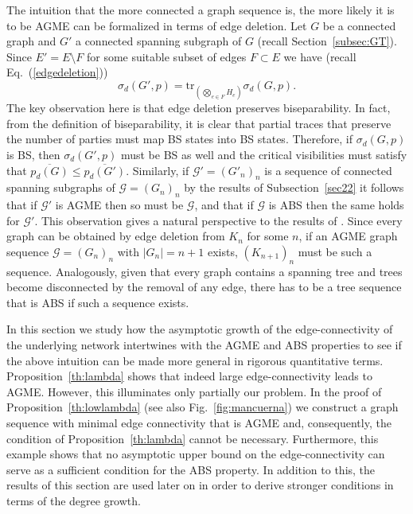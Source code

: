 \documentclass[a4paper,onecolumn,accepted=2024-12-14]{quantumarticle}
\theoremstyle{plain}
\def\tr{\mathrm{tr}}
\newcommand{\cG}{{\mathcal G}}         %
\begin{document}
The intuition that the more connected a graph sequence is, the more likely it is to be AGME can be formalized in terms of edge deletion. Let $G$ be a connected graph and $G'$ a connected spanning subgraph of $G$ (recall Section~\ref{subsec:GT}).
Since $E'=E\setminus F$ for some suitable subset of edges $F\subset E$ we have (recall Eq.~(\ref{edgedeletion}))
\begin{equation}
\sigma_d(G',p)=\tr_{\left(\bigotimes_{e\in F}H_e\right)}\sigma_d(G,p).
\end{equation}
The key observation here is that edge deletion preserves biseparability. In fact, from
the definition of biseparability, it is clear that partial traces that preserve the number of parties must map BS states into BS states. Therefore, if $\sigma_d(G,p)$ is BS, then $\sigma_d(G',p)$ must be BS as well and the critical visibilities must satisfy that $\overline{p_d(G)}\leq\overline{p_d(G')}$. Similarly, if $\cG'=(G'_n)_n$ is a sequence of connected spanning subgraphs of $\cG=(G_n)_n$ by the results of Subsection~\ref{sec22} it follows that if $\cG'$ is AGME then so must be $\cG$, and that if $\cG$ is ABS then the same holds for $\cG'$. This observation gives a natural perspective to the results of \cite{ASGME}.
Since every graph can be obtained by edge deletion from $K_n$ for some $n$, if an AGME graph sequence $\cG=(G_n)_n$ with $|G_n|=n+1$ exists, $(K_{n+1})_n$ must be such a sequence. Analogously, given that every graph contains a spanning tree and trees become disconnected by the removal of any edge, there has to be a tree sequence that is ABS if such a sequence exists.

In this section we study how the asymptotic growth of the edge-connectivity
of the underlying network intertwines with the AGME and ABS properties to see if the above intuition can be made more general in rigorous quantitative terms. Proposition~\ref{th:lambda} shows that indeed large edge-connectivity leads to AGME. However, this illuminates only partially our problem.
In the proof of Proposition~\ref{th:lowlambda} (see also Fig.~\ref{fig:mancuerna})
we construct a graph sequence with minimal edge connectivity that is AGME and, consequently, the condition of Proposition~\ref{th:lambda} cannot be necessary. Furthermore, this example shows that no asymptotic upper bound on the edge-connectivity can serve as a sufficient condition for the ABS property. In addition to this, the results of this section are used later on in order to derive stronger conditions in terms of the degree growth.
\end{document}
